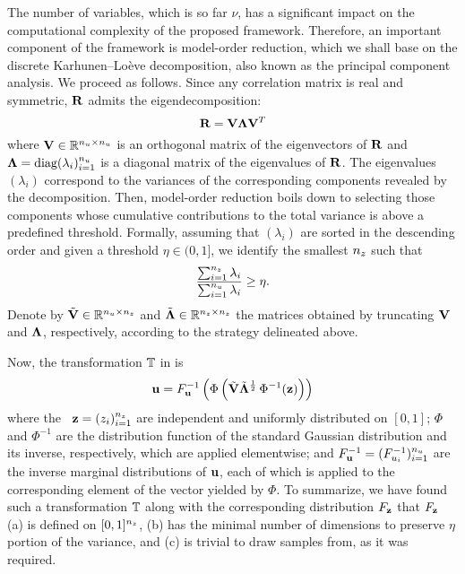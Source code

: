 The number of variables, which is so far $\nu$, has a significant impact on the
computational complexity of the proposed framework. Therefore, an important
component of the framework is model-order reduction, which we shall base on the
discrete Karhunen--Lo\`{e}ve decomposition, also known as the principal
component analysis. We proceed as follows. Since any correlation matrix is real
and symmetric, $\mathbf{R}$ admits the eigendecomposition:
\[
  \mathbf{R} = \mathbf{V} \mathbf{\Lambda} \mathbf{V}^T
\]
where $\mathbf{V} \in \mathbb{R}^{{n_u} \times {n_u}}$ is an orthogonal matrix of the
eigenvectors of $\mathbf{R}$ and $\mathbf{\Lambda} = \text{diag}(\lambda_i)_{i = 1}^{n_u}$
is a diagonal matrix of the eigenvalues of $\mathbf{R}$. The eigenvalues
$(\lambda_i)$ correspond to the variances of the corresponding components
revealed by the decomposition. Then, model-order reduction boils down to
selecting those components whose cumulative contributions to the total variance
is above a predefined threshold. Formally, assuming that $(\lambda_i)$ are
sorted in the descending order and given a threshold $\eta \in (0, 1]$, we
identify the smallest ${n_z}$ such that
\[
  \frac{\sum_{i = 1}^{n_z} \lambda_i}{\sum_{i = 1}^{n_u} \lambda_i} \geq \eta.
\]
Denote by $\tilde{\mathbf{V}} \in \mathbb{R}^{{n_u} \times {n_z}}$ and $\tilde{\mathbf{\Lambda}}
\in\mathbb{R}^{{n_z} \times {n_z}}$ the matrices obtained by truncating $\mathbf{V}$ and
$\mathbf{\Lambda}$, respectively, according to the strategy delineated above.

Now, the transformation $\mathbb{T}$ in  is
\begin{equation} \elab{transformation}
  \vu = \distribution_\vu^{-1} \left( \Phi\left( \tilde{\m{V}} \tilde{\m{\Lambda}}^\frac{1}{2} \, \Phi^{-1}(\vz) \right) \right)
\end{equation}
where the \rvs\ $\mathbf{z} = (z_i)_{i = 1}^{n_z}$ are independent and uniformly
distributed on $[0, 1]$; $\Phi$ and $\Phi^{-1}$ are the distribution function of
the standard Gaussian distribution and its inverse, respectively, which are
applied elementwise; and $F_{\mathbf{u}}^{-1} =
(F_{u_i}^{-1})_{i = 1}^{n_u}$ are the inverse marginal distributions
of $\mathbf{u}$, each of which is applied to the corresponding element of the vector
yielded by $\Phi$. To summarize, we have found such a transformation
$\mathbb{T}$ along with the corresponding distribution $F_{\mathbf{z}}$
that $F_{\mathbf{z}}$ (a) is defined on $[0, 1]^{n_z}$, (b) has the minimal
number of dimensions to preserve $\eta$ portion of the variance, and (c) is
trivial to draw samples from, as it was required.
